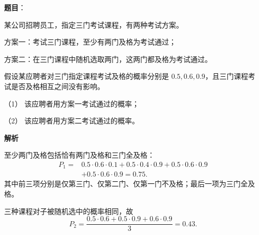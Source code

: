 \begin{answer}

\textbf{题目}：

某公司招聘员工，指定三门考试课程，有两种考试方案。

方案一：考试三门课程，至少有两门及格为考试通过；

方案二：在三门课程中随机选取两门，这两门都及格为考试通过。

假设某应聘者对三门指定课程考试及格的概率分别是 $0.5,0.6,0.9$，且三门课程考试是否及格相互之间没有影响。

（1） 该应聘者用方案一考试通过的概率；

（2） 该应聘者用方案二考试通过的概率。

\textbf{解析}


至少两门及格包括恰有两门及格和三门全及格：
\nopagebreak[4]
\[
\begin{aligned}
P_1={}&0.5\cdot0.6\cdot0.1
+0.5\cdot0.4\cdot0.9
+0.5\cdot0.6\cdot0.9\\
&+0.5\cdot0.6\cdot0.9
=0.75.
\end{aligned}
\]
其中前三项分别是仅第三门、仅第二门、仅第一门不及格；最后一项为三门全及格。


三种课程对子被随机选中的概率相同，故
\nopagebreak[4]
\[
P_2=\frac{0.5\cdot0.6+0.5\cdot0.9+0.6\cdot0.9}{3}
=0.43.
\]



\end{answer}
